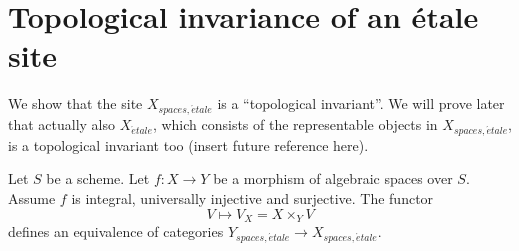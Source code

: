 \section{Topological invariance of an \'etale site}
\label{section-topological-invariance}

\noindent
We show that the site $X_{spaces, \acute{e}tale}$ is a
``topological invariant''.
We will prove later that actually also $X_{\acute{e}tale}$, which
consists of the representable objects in $X_{spaces, \acute{e}tale}$,
is a topological invariant too (insert future reference here).

\begin{theorem}
\label{theorem-topological-invariance}
Let $S$ be a scheme.
Let $f : X \to Y$ be a morphism of algebraic spaces over $S$.
Assume $f$ is integral, universally injective and surjective.
The functor
$$
V \longmapsto V_X = X \times_Y V
$$
defines an equivalence of categories
$Y_{spaces, \acute{e}tale} \to X_{spaces, \acute{e}tale}$.
\end{theorem}

